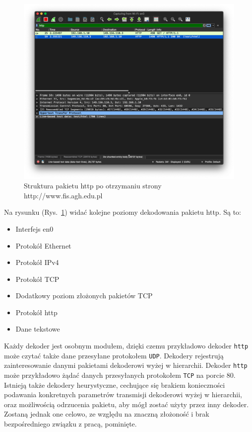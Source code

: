 \documentclass[a4paper, 12pt, twoside, openright]{article}
\begin{document}
	\begin{figure}[h]
		\centering
			\includegraphics[width=1.0\textwidth]{img/screenshot_fis.png}
		\caption{Struktura pakietu http po otrzymaniu strony http://www.fis.agh.edu.pl}
		\label{fig:fis}
	\end{figure}

	Na rysunku (Rys.~\ref{fig:fis}) widać kolejne poziomy dekodowania pakietu http. Są to:
	\begin{itemize}
		\item Interfejs en0
		\item Protokół Ethernet
		\item Protokół IPv4
		\item Protokół TCP
		\item Dodatkowy poziom złożonych pakietów TCP
		\item Protokół http
		\item Dane tekstowe
	\end{itemize}

	Każdy dekoder jest osobnym modułem, dzięki czemu przykładowo dekoder \texttt{http} może czytać także dane przesyłane protokołem \texttt{UDP}.
	Dekodery rejestrują zainteresowanie danymi pakietami dekoderowi wyżej w hierarchii. Dekoder \texttt{http} może przykładowo
	żądać danych przesyłanych protokołem \texttt{TCP} na porcie 80. Istnieją także dekodery heurystyczne, cechujące się brakiem
	konieczności podawania konkretnych parametrów transmisji dekoderowi wyżej w hierarchii, oraz możliwością odrzucenia pakietu,
	aby mógł zostać użyty przez inny dekoder. Zostaną jednak one celowo, ze względu na znaczną złożoność i brak bezpośredniego
	związku z pracą, pominięte.
\end{document}

